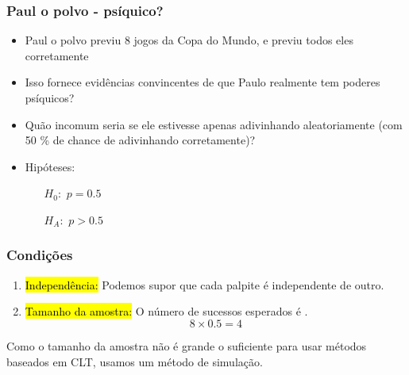 \documentclass[11pt]{beamer}
\begin{document}

\begin{frame}
\frametitle{Paul o polvo - psíquico?}

\begin{itemize}

\item Paul o polvo previu 8 jogos da Copa do Mundo, e previu todos eles corretamente

\pause

\item Isso fornece evidências convincentes de que Paulo realmente tem poderes psíquicos?

\pause

\item Quão incomum seria se ele estivesse apenas adivinhando aleatoriamente (com 50 \% de chance de
adivinhando corretamente)?

\pause

\item Hipóteses:
\begin{itemize}
\item[$H_0:$] $p = 0.5$
\item[$H_A:$] $p > 0.5$
\end{itemize}

\end{itemize}

\end{frame}


\begin{frame}
\frametitle{Condições}

\begin{enumerate}

\item \hl{Independência:} Podemos supor que cada palpite é independente de outro.

\pause

\item \hl{Tamanho da amostra:} O número de sucessos esperados é .
\[ 8 \times 0.5 = 4 \]

\end{enumerate}

\pause

\vspace{1cm}


\pause

Como o tamanho da amostra não é grande o suficiente para usar métodos baseados em CLT, usamos um método de simulação.

\end{frame}
\end{document}
